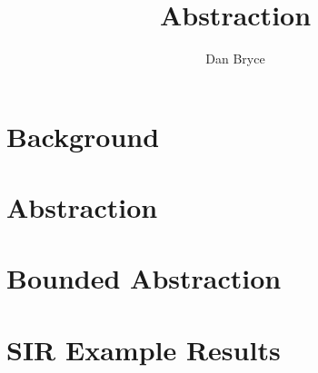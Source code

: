 \documentclass[10pt]{article}
\title{\funman Abstraction}
\author{Dan Bryce}
\newcommand{\region}{\bf X}
\newcommand{\posregion}{{\region}^+}
\newcommand{\negregion}{{\region}^-}
\newcommand{\irrelevantregion}{{\region}^\oslash}
\newcommand{\point}{{\bf x}}
\newcommand{\model}{{\bf M}}
\newcommand{\query}{{\bf Q}}
\newcommand{\reals}{{\mathbb{R}}}
\begin{document}
\maketitle

\section{Background}


\section{Abstraction}


\section{Bounded Abstraction}


\section{SIR Example Results}


% 



\end{document}
